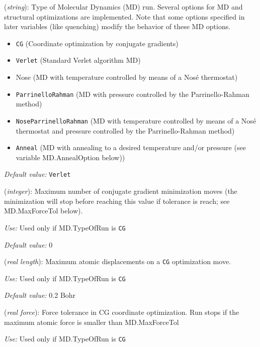 \begin{description}
\itemsep 10pt
\parsep 0pt

\item[{\bf MD.TypeOfRun}] ({\it string}): Type of Molecular Dynamics (MD)  run. 
Several options for MD and structural optimizations are 
implemented. Note that some options specified in later variables
(like quenching) modify the behavior of these MD options.
\begin{itemize}
\item {\tt CG} (Coordinate optimization by conjugate gradients)
\item {\tt Verlet} (Standard Verlet algorithm MD)
\item Nose  (MD with temperature controlled  by means of a Nos\'e 
thermostat)
\item {\tt ParrinelloRahman}  (MD with pressure controlled by 
the Parrinello-Rahman method)
\item {\tt NoseParrinelloRahman}  (MD with temperature controlled
by means of a Nos\'e thermostat and pressure controlled by 
the Parrinello-Rahman method)
\item {\tt Anneal}  (MD with annealing to a desired
temperature and/or pressure (see variable MD.AnnealOption below))
\end{itemize}
    
{\it Default value:} {\tt Verlet}

\item[{\bf MD.NumCGsteps}] ({\it integer}): 
Maximum number of conjugate gradient minimization
moves (the minimization will stop before reaching this value
if tolerance is reach; see MD.MaxForceTol below).

{\it Use:} Used only if MD.TypeOfRun is {\tt CG}
    
{\it Default value:} 0

\item[{\bf MD.MaxCGDispl}] ({\it real length}): Maximum atomic displacements
on a {\tt CG} optimization move.

{\it Use:} Used only if MD.TypeOfRun is {\tt CG}
    
{\it Default value:} 0.2 Bohr

\item[{\bf MD.MaxForceTol}] ({\it real force}): Force tolerance
in CG coordinate optimization.  
Run stops if the maximum atomic force is
smaller than MD.MaxForceTol

{\it Use:} Used only if MD.TypeOfRun is {\tt CG}
    

\end{description}
